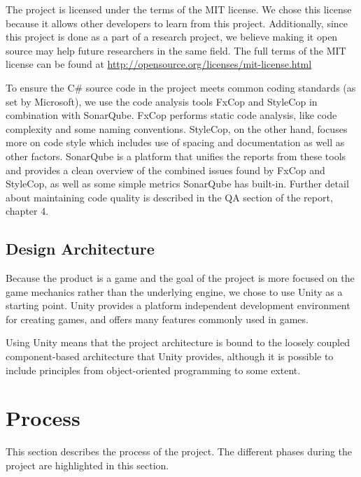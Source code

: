 			The project is licensed under the terms of the MIT license. We chose
			this license because it allows other developers to learn from this
			project. Additionally, since this project is done as a part of a
			research project, we believe making it open source may
			help future researchers in the same field. The full terms of the MIT
			license can be found at \url{http://opensource.org/licenses/mit-license.html}
			
			To ensure the C\# source code in the project meets common coding standards
			(as set by Microsoft), we use the code analysis tools FxCop and StyleCop
			in combination with SonarQube. FxCop performs static code analysis, like
			code complexity and some naming conventions. StyleCop, on the other hand,
			focuses more on code style which includes use of spacing and
			documentation as well as other factors. SonarQube is a platform that
			unifies the reports from these tools and provides a clean overview of the
			combined issues found by FxCop and StyleCop, as well as some simple metrics
			SonarQube has built-in. Further detail about maintaining code quality
			is described in the QA section of the report, chapter 4.
			
		\subsection{Design Architecture} \label{ssec:designarchitecture}
			Because the product is a game and the goal of the project is more
			focused on the game mechanics rather than the underlying engine, we chose
			to use Unity as a starting point. Unity provides a platform independent
			development environment for creating games, and offers many features 
			commonly used in games.
			
			Using Unity means that the project architecture is bound to the
			loosely coupled component-based architecture that Unity provides,
			although it is possible to include principles from object-oriented
			programming to some extent.
			
		\section{Process}\label{sec:process}
			This section describes the process of the project. The different phases
			during the project are highlighted in this section.
		
